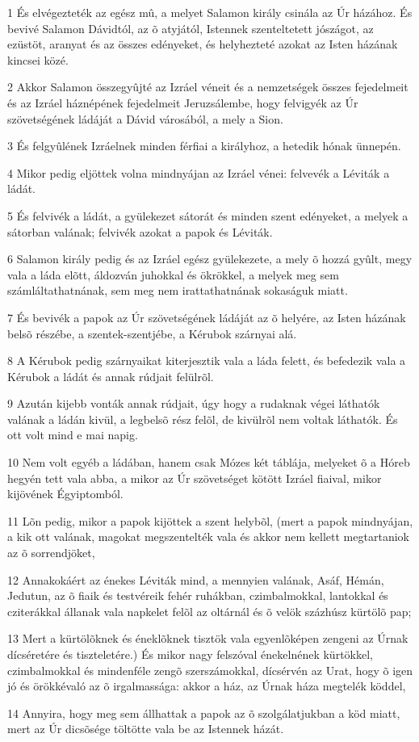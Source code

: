 \par 1 És elvégezteték az egész mû, a melyet Salamon király csinála az Úr házához. És bevivé  Salamon Dávidtól, az õ atyjától, Istennek szenteltetett jószágot, az ezüstöt, aranyat és az összes edényeket, és helyhezteté azokat az Isten házának kincsei közé.
\par 2 Akkor Salamon összegyûjté az Izráel véneit és a nemzetségek összes fejedelmeit és az Izráel háznépének fejedelmeit Jeruzsálembe, hogy felvigyék az Úr szövetségének ládáját a  Dávid városából, a mely a Sion.
\par 3 És felgyûlének Izráelnek minden férfiai a királyhoz, a hetedik hónak ünnepén.
\par 4 Mikor pedig eljöttek volna mindnyájan az Izráel vénei: felvevék a Léviták a ládát.
\par 5 És felvivék a ládát, a gyülekezet sátorát és minden szent edényeket, a melyek a sátorban valának; felvivék azokat a papok és Léviták.
\par 6 Salamon király pedig és az Izráel egész gyülekezete, a mely õ hozzá gyûlt, megy vala a láda elõtt, áldozván juhokkal és ökrökkel, a melyek meg sem számláltathatnának, sem meg nem irattathatnának sokaságuk miatt.
\par 7 És bevivék a papok az Úr szövetségének ládáját az õ helyére, az Isten házának belsõ részébe, a szentek-szentjébe, a Kérubok szárnyai alá.
\par 8 A Kérubok pedig szárnyaikat kiterjesztik vala a láda felett, és befedezik vala a Kérubok a ládát és annak rúdjait felülrõl.
\par 9 Azután kijebb vonták annak rúdjait, úgy hogy a rudaknak végei láthatók valának a ládán kivül, a legbelsõ rész felõl, de kivülrõl nem voltak láthatók. És ott volt mind e mai napig.
\par 10 Nem volt egyéb a ládában, hanem csak Mózes két táblája, melyeket õ a Hóreb hegyén tett vala abba, a mikor az Úr szövetséget kötött Izráel fiaival, mikor kijövének Égyiptomból.
\par 11 Lõn pedig, mikor a papok kijöttek a szent helybõl, (mert a papok mindnyájan, a kik ott valának, magokat megszentelték vala és akkor nem kellett megtartaniok az õ sorrendjöket,
\par 12 Annakokáért az énekes Léviták mind, a mennyien valának, Asáf, Hémán, Jedutun, az õ fiaik és testvéreik fehér ruhákban, czimbalmokkal, lantokkal és cziterákkal állanak vala napkelet felõl az oltárnál és õ velök százhúsz kürtölõ pap;
\par 13 Mert a kürtölõknek és éneklõknek tisztök vala egyenlõképen zengeni az Úrnak dícséretére és tiszteletére.) És mikor nagy felszóval énekelnének kürtökkel, czimbalmokkal és mindenféle zengõ szerszámokkal, dícsérvén az Urat, hogy õ igen jó és örökkévaló az õ irgalmassága: akkor a ház, az Úrnak háza megtelék köddel,
\par 14 Annyira, hogy meg sem állhattak a papok az õ szolgálatjukban a köd miatt, mert az Úr dicsõsége töltötte vala be az Istennek házát.

